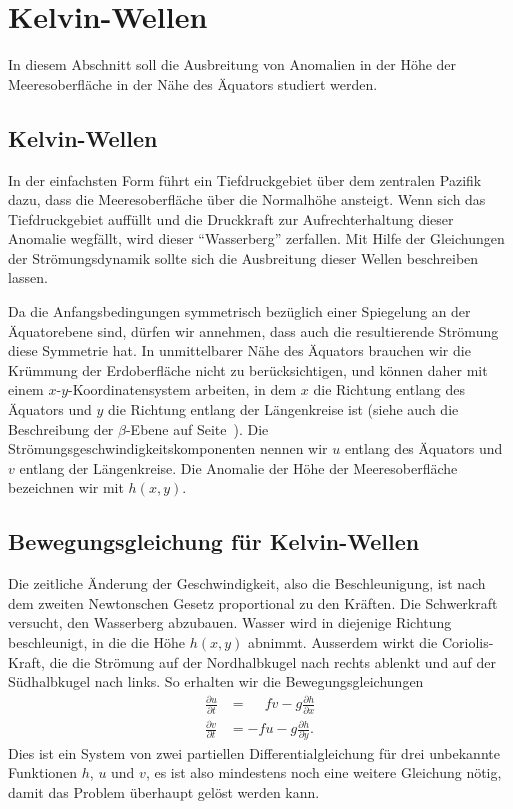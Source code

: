 %
%
%
\section{Kelvin-Wellen\label{section:elnino:kelvin}}
In diesem Abschnitt soll die Ausbreitung von Anomalien in der Höhe
der Meeresoberfläche in der Nähe des Äquators studiert werden.

\subsection{Kelvin-Wellen\label{subsection:kelvin}}
In der einfachsten Form führt ein Tiefdruckgebiet über dem zentralen
Pazifik dazu, dass die Meeresoberfläche über die Normalhöhe ansteigt.
Wenn sich das Tiefdruckgebiet auffüllt und die Druckkraft zur Aufrechterhaltung
dieser Anomalie wegfällt, wird dieser ``Wasserberg'' zerfallen.
Mit Hilfe der Gleichungen der Strömungsdynamik sollte sich die Ausbreitung
dieser Wellen beschreiben lassen.

Da die Anfangsbedingungen symmetrisch bezüglich einer Spiegelung an
der Äquatorebene sind, dürfen wir annehmen, dass auch die resultierende
Strömung diese Symmetrie hat.
In unmittelbarer Nähe des Äquators brauchen wir die Krümmung der
Erdoberfläche nicht zu berücksichtigen, und können daher mit einem
$x$-$y$-Koordinatensystem arbeiten, in dem $x$ die Richtung entlang des
Äquators und $y$ die Richtung entlang der Längenkreise ist (siehe auch
die Beschreibung der $\beta$-Ebene auf
Seite~\pageref{skript:betaplane:definition}).
%
Die Strömungsgeschwindigkeitskomponenten nennen wir $u$ entlang des
Äquators und $v$ entlang der Längenkreise.
Die Anomalie der Höhe der Meeresoberfläche bezeichnen wir mit $h(x,y)$.

\subsection{Bewegungsgleichung für Kelvin-Wellen}
Die zeitliche Änderung der Geschwindigkeit, also die Beschleunigung,
ist nach dem zweiten Newtonschen Gesetz proportional zu den Kräften.
Die Schwerkraft versucht, den Wasserberg abzubauen.
Wasser wird in diejenige Richtung beschleunigt, in die die Höhe $h(x,y)$
abnimmt.
Ausserdem wirkt die Coriolis-Kraft, die die Strömung auf der Nordhalbkugel
nach rechts ablenkt und auf der Südhalbkugel nach links.
So erhalten wir die Bewegungsgleichungen
\begin{equation}
\begin{aligned}
\frac{\partial u}{\partial t}
&=
\phantom{-}
fv - g\frac{\partial h}{\partial x}
\\
\frac{\partial v}{\partial t}
&=
-fu - g\frac{\partial h}{\partial y}.
\end{aligned}
\label{elnino:kelvin:newton}
\end{equation}
Dies ist ein System von zwei partiellen Differentialgleichung für 
drei unbekannte Funktionen $h$, $u$ und $v$, es ist also mindestens
noch eine weitere Gleichung nötig, damit das Problem überhaupt gelöst
werden kann.


